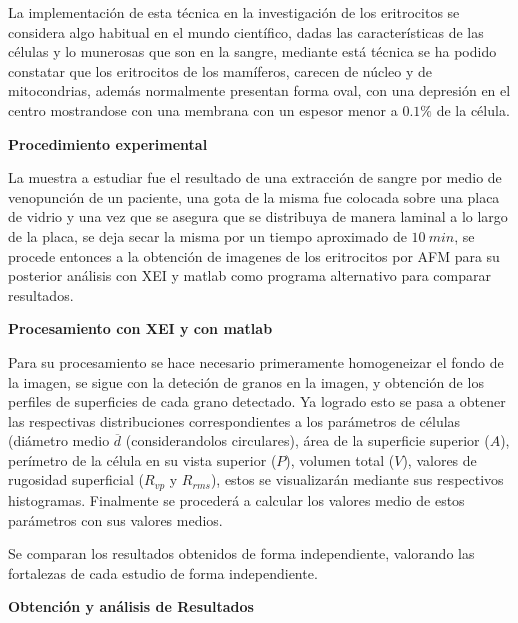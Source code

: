 La implementación de esta técnica en la investigación de los eritrocitos se considera algo habitual en el mundo científico, dadas las características de las células y lo munerosas que son en la sangre, mediante está técnica se ha podido constatar que los eritrocitos de los mamíferos, carecen de núcleo y de mitocondrias, además normalmente presentan forma oval, con una depresión en el centro mostrandose con una membrana con un espesor menor
a $0.1\%$ de la célula.

\textbf{\textcolor{azul50}{Procedimiento experimental}}

La muestra a estudiar fue el resultado de una extracción de sangre por medio de venopunción de un paciente, una gota de la misma fue colocada sobre una placa de vidrio  y una vez que se asegura que se distribuya de manera laminal a lo largo de la placa, se deja secar la misma por un tiempo aproximado de $10~min$, se procede entonces a la obtención de imagenes de los eritrocitos por AFM para su posterior análisis con XEI y matlab como programa alternativo para comparar resultados.

\textbf{Procesamiento con XEI y con matlab}

Para su procesamiento se hace necesario primeramente homogeneizar el fondo de la imagen, se sigue con la deteción de granos en la imagen, y obtención de los perfiles de superficies de cada grano detectado. Ya logrado esto se pasa a obtener las respectivas distribuciones correspondientes a los parámetros de células (diámetro medio $\overline{d}$ (considerandolos circulares), área de la superficie superior ($A$), perímetro de la célula en su vista superior ($P$), volumen total ($V$), valores de rugosidad superficial ($R_{vp}$ y $R_{rms}$), estos se visualizarán mediante sus respectivos histogramas. Finalmente se procederá a calcular los valores medio de estos parámetros con sus valores medios.

Se comparan los resultados obtenidos de forma independiente, valorando las fortalezas de cada estudio de forma independiente.

\textbf{\textcolor{azul50}{Obtención y análisis de Resultados}}

